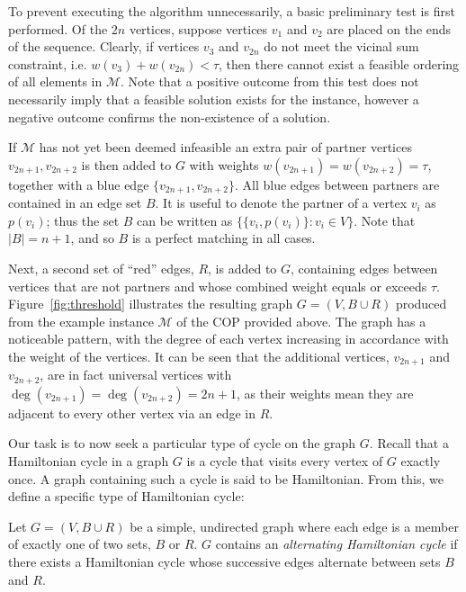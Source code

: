 \documentclass[authoryear]{elsarticle}
\begin{document}
To prevent executing the algorithm unnecessarily, a basic preliminary test is first performed. Of the $2n$ vertices, suppose vertices $v_1$ and $v_2$ are placed on the ends of the sequence. Clearly, if vertices $v_3$ and $v_{2n}$ do not meet the vicinal sum constraint, i.e. $w(v_3) + w(v_{2n}) < \tau$, then there cannot exist a feasible ordering of all elements in $\mathcal{M}$. Note that a positive outcome from this test does not necessarily imply that a feasible solution exists for the instance, however a negative outcome confirms the non-existence of a solution.

If $\mathcal{M}$ has not yet been deemed infeasible an extra pair of partner vertices $v_{2n+1}, v_{2n+2}$ is then added to $G$ with weights $w(v_{2n+1}) = w(v_{2n+2}) = \tau$, together with a blue edge $\{v_{2n+1}, v_{2n+2}\}$. All blue edges between partners are contained in an edge set $B$. It is useful to denote the partner of a vertex $v_i$ as $p(v_i)$; thus the set $B$ can be written as $\{\{v_i, p(v_i)\} : v_i \in V\}$. Note that $|B| = n+1$, and so $B$ is a perfect matching in all cases. 

Next, a second set of ``red'' edges, $R$, is added to $G$, containing edges between vertices that are not partners and whose combined weight equals or exceeds $\tau$. Figure~\ref{fig:threshold} illustrates the resulting graph $G = (V, B \cup R)$ produced from the example instance $\mathcal{M}$ of the COP provided above. The graph has a noticeable pattern, with the degree of each vertex increasing in accordance with the weight of the vertices. It can be seen that the additional vertices, $v_{2n+1}$ and $v_{2n+2}$, are in fact universal vertices with $\deg(v_{2n+1}) = \deg(v_{2n+2}) = 2n+1$, as their weights mean they are adjacent to every other vertex via an edge in $R$.

Our task is to now seek a particular type of cycle on the graph $G$. Recall that a Hamiltonian cycle in a graph $G$ is a cycle that visits every vertex of $G$ exactly once. A graph containing such a cycle is said to be Hamiltonian. From this, we define a specific type of Hamiltonian cycle:

\begin{definition} %
	\label{defn:althamcycle}
	Let $G = (V, B \cup R)$ be a simple, undirected graph where each edge is a member of exactly one of two sets, $B$ or $R$. $G$ contains an \emph{alternating Hamiltonian cycle} if there exists a Hamiltonian cycle whose successive edges alternate between sets $B$ and $R$.
\end{definition}
\end{document}
